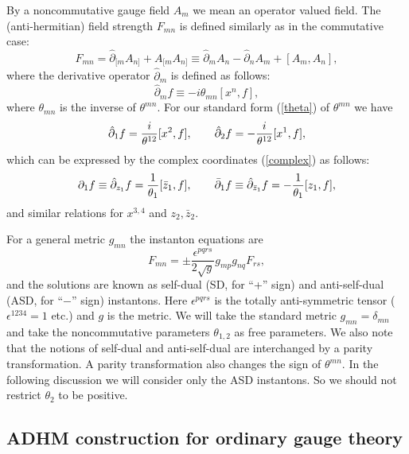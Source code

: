 \documentclass[a4paper,a4paper]{article}
\begin{document}
By a noncommutative gauge field $A_m$ we mean an operator valued
field. The (anti-hermitian) field strength $F_{mn}$ is defined
similarly as in the commutative case:
\begin{equation}
\label{F by A} F_{mn}=\hat\partial_{[m} A_{n]} + A_{[m} A_{n]}
\equiv \hat\partial_m A_n - \hat\partial_n A_m + [A_m, A_n],
\end{equation}
where the derivative operator $\hat\partial_m$ is defined as
follows:
\begin{equation}
\hat\partial_m f \equiv - i \theta_{mn} [x^n, f],
\end{equation}
where $\theta_{mn}$ is the inverse of $\theta^{mn}$. For our
standard form (\ref{theta}) of $\theta^{mn}$ we have
\begin{equation}
\hat\partial_1 f = {i \over \theta^{12}} [x^2,f], \qquad
\hat\partial_2 f = - {i \over \theta^{12}} [x^1,f],
\end{equation}
which can be expressed by the complex coordinates (\ref{complex})
as follows:
\begin{equation}
\partial_1 f \equiv \hat\partial_{z_1}f = {1\over\theta_1}
[\bar z_1, f], \qquad \bar\partial_1 f \equiv \hat\partial_{\bar
z_1}f = - {1\over\theta_1}[z_1, f],
\end{equation}
and similar relations for $x^{3,4}$ and $z_2,\bar{z}_2$.

For a general metric $g_{mn}$ the instanton equations are
\begin{equation}
\label{instanton}
F_{mn}=\pm\frac{\epsilon^{pqrs}}{2\sqrt{g}}g_{mp}g_{nq}F_{rs},
\end{equation}
and the solutions are known as self-dual (SD, for ``+'' sign) and
anti-self-dual (ASD, for ``$-$'' sign) instantons. Here
$\epsilon^{pqrs}$ is the totally anti-symmetric tensor
($\epsilon^{1234}=1$ etc.) and $g$ is the metric. We will take the
standard metric $g_{mn}=\delta_{mn}$ and take the noncommutative
parameters $\theta_{1,2}$ as free parameters. We also note that
the notions of self-dual and anti-self-dual are interchanged by a
parity transformation. A parity transformation also changes the
sign of $\theta^{mn}$. In the following discussion we will
consider only the ASD instantons. So we should not restrict
$\theta_2$ to be positive.

\subsection{ADHM construction for ordinary gauge theory}
\end{document}
